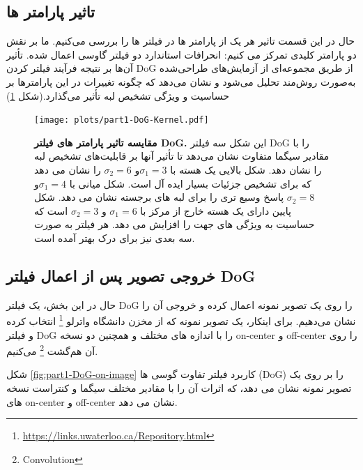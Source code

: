         \subsection{تاثیر پارامتر ها}
            حال در این قسمت تاثیر هر یک از پارامتر ها در فیلتر ها را بررسی می‌کنیم. ما بر نقش دو پارامتر کلیدی تمرکز می کنیم: انحرافات استاندارد دو فیلتر گاوسی اعمال شده. تأثیر آن‌ها بر نتیجه فرآیند فیلتر کردن 
            DoG 
            از طریق مجموعه‌ای از آزمایش‌های طراحی‌شده به‌صورت روش‌مند تحلیل می‌شود و نشان می‌دهد که چگونه تغییرات در این پارامترها بر حساسیت و ویژگی تشخیص لبه تأثیر می‌گذارد.(شکل \ref{fig:part1-DoG-Kernel})

            \begin{figure}[!ht]
                \centering
                \texttt{[image: plots/part1-DoG-Kernel.pdf]} 
                \captionsetup{width=.9\linewidth}
                \caption{\textbf{مقایسه تاثیر پارامتر های فیلتر DoG.} 
                این شکل سه فیلتر 
                DoG 
                را با مقادیر سیگما متفاوت نشان می‌دهد تا تأثیر آنها بر قابلیت‌های تشخیص لبه را نشان دهد. شکل بالایی یک هسته با $\sigma_1=3 $و $\sigma_2=6 $
                را نشان می دهد که برای تشخیص جزئیات بسیار ایده آل است. شکل میانی با 
                $\sigma_1=4 $و $\sigma_2=8$ 
                پاسخ وسیع تری را برای لبه های برجسته نشان می دهد. شکل پایین دارای یک هسته خارج از مرکز با 
                $\sigma_1=6$ و $\sigma_2=3$ 
                است که حساسیت به ویژگی های جهت را افزایش می دهد. هر فیلتر به صورت سه بعدی نیز برای درک بهتر آمده است.}
                \label{fig:part1-DoG-Kernel}
            \end{figure}
        \subsection{خروجی تصویر پس از اعمال فیلتر DoG}
            حال در این بخش، یک فیلتر 
            DoG 
            را روی یک تصویر نمونه اعمال کرده و خروجی آن را نشان می‌دهیم. برای اینکار، یک تصویر نمونه که از مخزن دانشگاه واترلو 
            \footnote{\href{https://links.uwaterloo.ca/Repository.html}{https://links.uwaterloo.ca/Repository.html}}
            انتخاب کرده و فیلتر 
            DoG 
            را با اندازه های مختلف و همچنین دو نسخه 
            on-center 
            و 
            off-center 
            را روی آن هم‌گشت
            \footnote{Convolution}
            می‌کنیم. 

            شکل
            \ref{fig:part1-DoG-on-image}
            کاربرد فیلتر تفاوت گوسی ها 
            (DoG) 
            را بر روی یک تصویر نمونه نشان می دهد، که اثرات آن را با مقادیر مختلف سیگما و کنتراست نسخه های 
            on-center
            و 
            off-center
            نشان می دهد.

